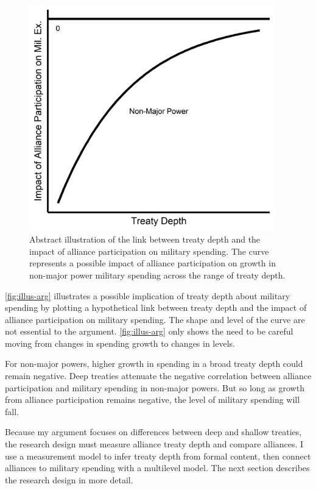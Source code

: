 \documentclass[12pt]{article}
\begin{document}
\begin{figure}[htbp]
	\centering
		\includegraphics[width=0.95\textwidth]{../figures/illus-arg.png}
	\caption{Abstract illustration of the link between treaty depth and the impact of alliance participation on military spending.
	The curve represents a possible impact of alliance participation on growth in non-major power military spending across the range of treaty depth.}
	\label{fig:illus-arg}
\end{figure}


\autoref{fig:illus-arg} illustrates a possible implication of treaty depth about military spending by plotting a hypothetical link between treaty depth and the impact of alliance participation on military spending. 
The shape and level of the curve are not essential to the argument.
\autoref{fig:illus-arg} only shows the need to be careful moving from changes in spending growth to changes in levels. 


For non-major powers, higher growth in spending in a broad treaty depth could remain negative. 
Deep treaties attenuate the negative correlation between alliance participation and military spending in non-major powers. 
But so long as growth from alliance participation remains negative, the level of military spending will fall. 


Because my argument focuses on differences between deep and shallow treaties, the research design must measure alliance treaty depth and compare alliances.  
I use a measurement model to infer treaty depth from formal content, then connect alliances to military spending with a multilevel model. 
The next section describes the research design in more detail. 
\end{document}
